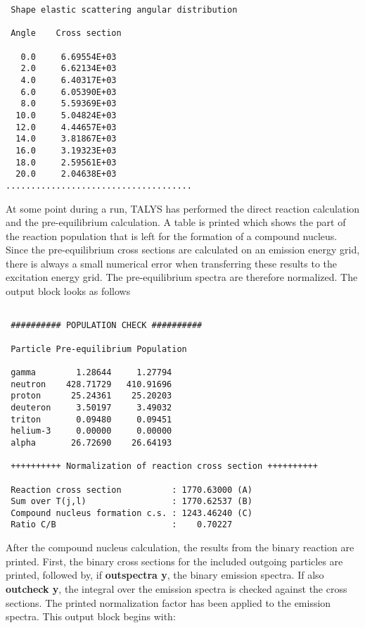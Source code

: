 \begin{samplecase}
{\begin{verbatim}
 Shape elastic scattering angular distribution

 Angle    Cross section

   0.0     6.69554E+03
   2.0     6.62134E+03
   4.0     6.40317E+03
   6.0     6.05390E+03
   8.0     5.59369E+03
  10.0     5.04824E+03
  12.0     4.44657E+03
  14.0     3.81867E+03
  16.0     3.19323E+03
  18.0     2.59561E+03
  20.0     2.04638E+03
.....................................
\end{verbatim} } \renewcommand{\baselinestretch}{1.07}\small\normalsize
\noindent
At some point during a run, TALYS has performed the direct reaction calculation
and the pre-equilibrium calculation. A table is printed which shows the part 
of the reaction population that is left for the formation of a compound 
nucleus. Since the 
pre-equilibrium cross sections are calculated on an emission energy grid, 
there is always a small numerical error when transferring these results to the 
excitation energy grid. The pre-equilibrium spectra are therefore normalized.
The output block looks as follows

{\small \begin{verbatim}

 ########## POPULATION CHECK ##########

 Particle Pre-equilibrium Population
  
 gamma        1.28644     1.27794
 neutron    428.71729   410.91696
 proton      25.24361    25.20203
 deuteron     3.50197     3.49032 
 triton       0.09480     0.09451
 helium-3     0.00000     0.00000
 alpha       26.72690    26.64193

 ++++++++++ Normalization of reaction cross section ++++++++++
   
 Reaction cross section          : 1770.63000 (A)
 Sum over T(j,l)                 : 1770.62537 (B)
 Compound nucleus formation c.s. : 1243.46240 (C)
 Ratio C/B                       :    0.70227
\end{verbatim} } \renewcommand{\baselinestretch}{1.07}\small\normalsize
\noindent
After the compound nucleus 
calculation, the results from the binary reaction are printed. First, the 
binary cross sections for the included outgoing particles are printed, 
followed by, if {\bf outspectra y}, the binary emission spectra. If also 
{\bf outcheck y}, the integral over the emission spectra is checked against the 
cross sections. The printed normalization factor has
been applied to the emission spectra. This output block begins with:

{\small \begin{verbatim}


\end{verbatim}}
\end{samplecase}
